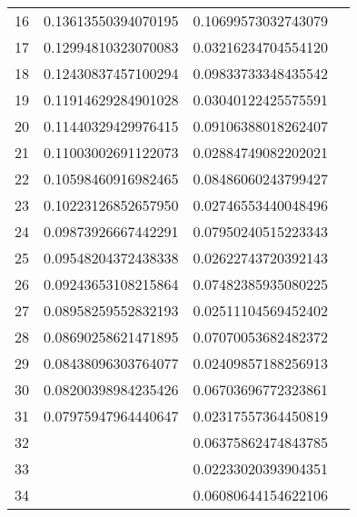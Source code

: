 \begin{table}[]
\begin{center}
\begin{tabular}{|c|c|c|c|}
16 & 0.13613550394070195 & 0.10699573032743079 &                      \\
17 & 0.12994810323070083 & 0.03216234704554120 &                      \\
18 & 0.12430837457100294 & 0.09833733348435542 &                      \\
19 & 0.11914629284901028 & 0.03040122425575591 &                      \\
20 & 0.11440329429976415 & 0.09106388018262407 &                      \\
21 & 0.11003002691122073 & 0.02884749082202021 &                      \\
22 & 0.10598460916982465 & 0.08486060243799427 &                      \\
23 & 0.10223126852657950 & 0.02746553440048496 &                      \\
24 & 0.09873926667442291 & 0.07950240515223343 &                      \\
25 & 0.09548204372438338 & 0.02622743720392143 &                      \\
26 & 0.09243653108215864 & 0.07482385935080225 &                      \\
27 & 0.08958259552832193 & 0.02511104569452402 &                      \\
28 & 0.08690258621471895 & 0.07070053682482372 &                      \\
29 & 0.08438096303764077 & 0.02409857188256913 &                      \\
30 & 0.08200398984235426 & 0.06703696772323861 &                      \\
31 & 0.07975947964440647 & 0.02317557364450819 &                      \\
32 &                     & 0.06375862474843785 &                      \\
33 &                     & 0.02233020393904351 &                      \\
34 &                     & 0.06080644154622106 &                      \\
\hline
\end{tabular}
\end{center}
\end{table}

